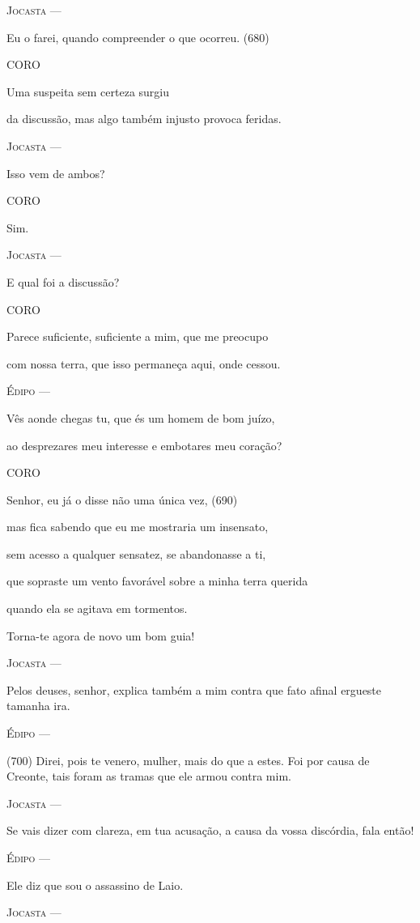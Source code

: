 \textsc{Jocasta} ---

Eu o farei, quando compreender o que ocorreu. (680)

\textsc{CORO}

Uma suspeita sem certeza surgiu

da discussão, mas algo também injusto provoca feridas.

\textsc{Jocasta} ---

Isso vem de ambos?

\textsc{CORO}

Sim.

\textsc{Jocasta} ---

E qual foi a discussão?

\textsc{CORO}

Parece suficiente, suficiente a mim, que me preocupo

com nossa terra, que isso permaneça aqui, onde cessou.

\textsc{Édipo} ---

Vês aonde chegas tu, que és um homem de bom juízo,

ao desprezares meu interesse e embotares meu coração?

\textsc{CORO}

Senhor, eu já o disse não uma única vez, (690)

mas fica sabendo que eu me mostraria um insensato,

sem acesso a qualquer sensatez, se abandonasse a ti,

que sopraste um vento favorável sobre a minha terra querida

quando ela se agitava em tormentos.

Torna-te agora de novo um bom guia!

\textsc{Jocasta} ---

Pelos deuses, senhor, explica também a mim contra que fato afinal
ergueste tamanha ira.

\textsc{Édipo} ---

(700) Direi, pois te venero, mulher, mais do que a estes. Foi por causa
de Creonte, tais foram as tramas que ele armou contra mim.

\textsc{Jocasta} ---

Se vais dizer com clareza, em tua acusação, a causa da vossa discórdia,
fala então!

\textsc{Édipo} ---

Ele diz que sou o assassino de Laio.

\textsc{Jocasta} ---

